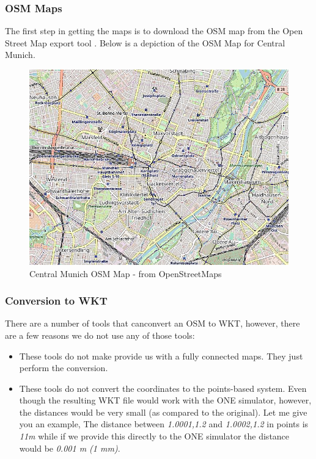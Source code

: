 	\subsubsection{OSM Maps}
	The first step in getting the maps is to download the OSM map from the Open Street Map export tool \cite{openstreetmap-export}. Below is a depiction of the OSM Map for Central Munich.
	\newline
	\begin{figure}[h]
		\centering
		\includegraphics[scale=0.5]{./figures/central-munich-osm}
		\caption{Central Munich OSM Map - from OpenStreetMaps \cite{openstreetmap}}
	\end{figure}

	\subsubsection{Conversion to WKT}
	There are a number of tools that canconvert an OSM to WKT, however, there are a few reasons we do not use any of those tools:
	\begin{itemize}
 	 \item These tools do not make provide us with a fully connected maps. They just perform the conversion.
   	 \item These tools do not convert the coordinates to the points-based system. Even though the resulting WKT file would work with the ONE simulator, however, the distances would be very small (as compared to the original). Let me give you an example, The distance between \textit{1.0001,1.2} and \textit{1.0002,1.2} in points is \textit{11m} while if we provide this directly to the ONE simulator the distance would be \textit{0.001 m (1 mm)}.
	\end{itemize}


